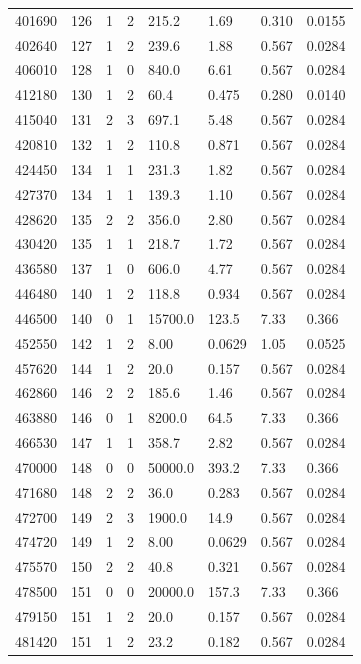 \documentclass[preview]{standalone}
\begin{document}
{{{{\begin{tabular}{L{1.2cm}C{1.2cm} C{0.3cm}C{0.5cm} C{1.4cm}C{1.4cm} C{1.4cm}C{1.4cm}}
  401690  &   126  & 1     &  2 &  215.2  & 1.69  & 0.310 &  0.0155   \\ 
  402640  &   127  & 1     &  2 &  239.6  & 1.88  & 0.567 &  0.0284   \\ 
  406010  &   128  & 1     &  0 &  840.0  & 6.61  & 0.567 &  0.0284   \\ 
  412180  &   130  & 1     &  2 &  60.4  & 0.475  & 0.280 &  0.0140   \\ 
  415040  &   131  & 2     &  3 &  697.1  & 5.48  & 0.567 &  0.0284   \\ 
  420810  &   132  & 1     &  2 &  110.8  & 0.871  & 0.567 &  0.0284   \\ 
  424450  &   134  & 1     &  1 &  231.3  & 1.82  & 0.567 &  0.0284   \\ 
  427370  &   134  & 1     &  1 &  139.3  & 1.10  & 0.567 &  0.0284   \\ 
  428620  &   135  & 2     &  2 &  356.0  & 2.80  & 0.567 &  0.0284   \\ 
  430420  &   135  & 1     &  1 &  218.7  & 1.72  & 0.567 &  0.0284   \\ 
  436580  &   137  & 1     &  0 &  606.0  & 4.77  & 0.567 &  0.0284   \\ 
  446480  &   140  & 1     &  2 &  118.8  & 0.934  & 0.567 &  0.0284   \\ 
  446500  &   140  & 0     &  1 &  15700.0  & 123.5  & 7.33 &  0.366   \\ 
  452550  &   142  & 1     &  2 &  8.00  & 0.0629  & 1.05 &  0.0525   \\ 
  457620  &   144  & 1     &  2 &  20.0  & 0.157  & 0.567 &  0.0284   \\ 
  462860  &   146  & 2     &  2 &  185.6  & 1.46  & 0.567 &  0.0284   \\ 
  463880  &   146  & 0     &  1 &  8200.0  & 64.5  & 7.33 &  0.366   \\ 
  466530  &   147  & 1     &  1 &  358.7  & 2.82  & 0.567 &  0.0284   \\ 
  470000  &   148  & 0     &  0 &  50000.0  & 393.2  & 7.33 &  0.366   \\ 
  471680  &   148  & 2     &  2 &  36.0  & 0.283  & 0.567 &  0.0284   \\ 
  472700  &   149  & 2     &  3 &  1900.0  & 14.9  & 0.567 &  0.0284   \\ 
  474720  &   149  & 1     &  2 &  8.00  & 0.0629  & 0.567 &  0.0284   \\ 
  475570  &   150  & 2     &  2 &  40.8  & 0.321  & 0.567 &  0.0284   \\ 
  478500  &   151  & 0     &  0 &  20000.0  & 157.3  & 7.33 &  0.366   \\ 
  479150  &   151  & 1     &  2 &  20.0  & 0.157  & 0.567 &  0.0284   \\ 
  481420  &   151  & 1     &  2 &  23.2  & 0.182  & 0.567 &  0.0284   \\ 
\hline 
\end{tabular} 

}}}}
\end{document}

